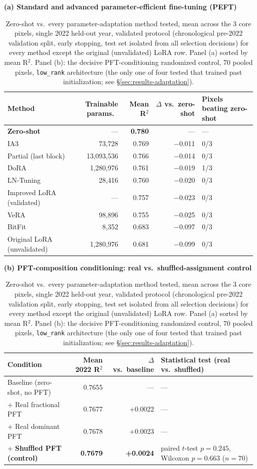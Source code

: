 \begin{table}[t]
\centering
\caption{Zero-shot vs.\ every parameter-adaptation method tested, mean across the 3 core pixels,
single 2022 held-out year, validated protocol (chronological pre-2022 validation split, early
stopping, test set isolated from all selection decisions) for every method except the original
(unvalidated) LoRA row. Panel (a) sorted by mean R$^2$. Panel (b): the decisive PFT-conditioning
randomized control, 70 pooled pixels, \texttt{low\_rank} architecture (the only one of four tested
that trained past initialization; see \S\ref{sec:results-adaptation}).}
\label{tab:adaptation}
\textbf{(a) Standard and advanced parameter-efficient fine-tuning (PEFT)}\\[0.3em]
\begin{tabular}{@{}lrrrl@{}}
\toprule
Method & Trainable params.\ & Mean R$^2$ & $\Delta$ vs.\ zero-shot & Pixels beating zero-shot \\
\midrule
\textbf{Zero-shot} & --- & \textbf{0.780} & --- & --- \\
IA3 & 73{,}728 & 0.769 & $-$0.011 & 0/3 \\
Partial (last block) & 13{,}093{,}536 & 0.766 & $-$0.014 & 0/3 \\
DoRA & 1{,}280{,}976 & 0.761 & $-$0.019 & 1/3 \\
LN-Tuning & 28{,}416 & 0.760 & $-$0.020 & 0/3 \\
Improved LoRA (validated) & --- & 0.757 & $-$0.023 & 0/3 \\
VeRA & 98{,}896 & 0.755 & $-$0.025 & 0/3 \\
BitFit & 8{,}352 & 0.683 & $-$0.097 & 0/3 \\
Original LoRA (unvalidated) & 1{,}280{,}976 & 0.681 & $-$0.099 & 0/3 \\
\bottomrule
\end{tabular}

\vspace{1.2em}
\textbf{(b) PFT-composition conditioning: real vs.\ shuffled-assignment control}\\[0.3em]
\begin{tabular}{@{}lrrl@{}}
\toprule
Condition & Mean 2022 R$^2$ & $\Delta$ vs.\ baseline & Statistical test (real vs.\ shuffled) \\
\midrule
Baseline (zero-shot, no PFT) & 0.7655 & --- & --- \\
+ Real fractional PFT & 0.7677 & +0.0022 & --- \\
+ Real dominant PFT & 0.7678 & +0.0023 & --- \\
+ \textbf{Shuffled PFT (control)} & \textbf{0.7679} & \textbf{+0.0024} & paired $t$-test $p=0.245$, Wilcoxon $p=0.663$ ($n=70$) \\
\bottomrule
\end{tabular}
\end{table}

